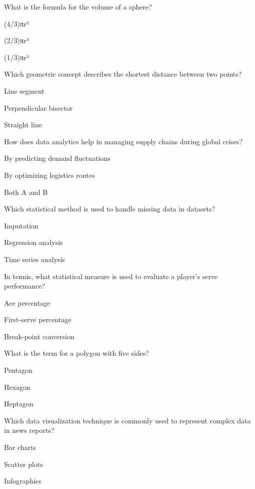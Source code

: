 \begin{enhancedmcq}{What is the formula for the volume of a sphere?}
\item (4/3)πr³
\item (2/3)πr³
\item (1/3)πr³

\end{enhancedmcq}
\begin{enhancedmcq}{Which geometric concept describes the shortest distance between two points?}
\item Line segment
\item Perpendicular bisector
\item Straight line

\end{enhancedmcq}
\begin{enhancedmcq}{How does data analytics help in managing supply chains during global crises?}
\item By predicting demand fluctuations
\item By optimizing logistics routes
\item Both A and B

\end{enhancedmcq}
\begin{enhancedmcq}{Which statistical method is used to handle missing data in datasets?}
\item Imputation
\item Regression analysis
\item Time series analysis

\end{enhancedmcq}
\begin{enhancedmcq}{In tennis, what statistical measure is used to evaluate a player's serve performance?}
\item Ace percentage
\item First‑serve percentage
\item Break‑point conversion

\end{enhancedmcq}
\begin{enhancedmcq}{What is the term for a polygon with five sides?}
\item Pentagon
\item Hexagon
\item Heptagon

\end{enhancedmcq}
\begin{enhancedmcq}{Which data visualization technique is commonly used to represent complex data in news reports?}
\item Bar charts
\item Scatter plots
\item Infographics

\end{enhancedmcq}
